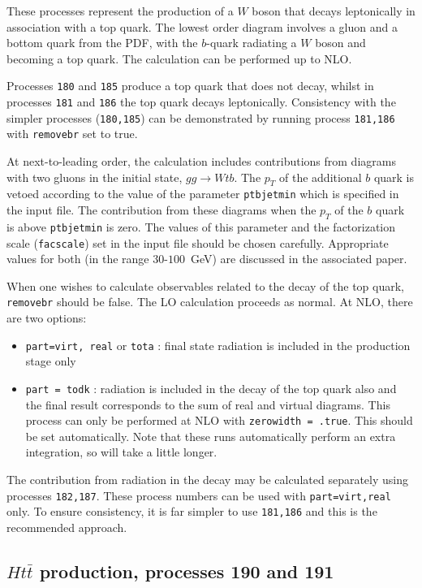\documentclass[12pt]{article}
\begin{document}
These processes represent the production of a $W$ boson that decays leptonically
in association with a top quark. The lowest order diagram involves a gluon and
a bottom quark from the PDF, with the $b$-quark radiating a $W$ boson and
becoming a top quark. The calculation can be performed up to NLO.

Processes {\tt 180} and {\tt 185} produce a top quark that does not decay,
whilst in processes {\tt 181} and {\tt 186} the top quark decays leptonically.
Consistency with
the simpler processes ({\tt 180,185}) can be demonstrated by running process
{\tt 181,186} with {\tt removebr} set to true.

At next-to-leading order, the calculation includes contributions from diagrams
with two gluons in the initial state, $gg \rightarrow Wtb$. The $p_T$ of the
additional $b$ quark is vetoed according to the value of the parameter
{\tt ptbjetmin} which is specified in the input file. The contribution from
these diagrams when the $p_T$ of the $b$ quark is above {\tt ptbjetmin}
is zero. The values of this parameter and the factorization scale ({\tt facscale})
set in the input file should be chosen carefully. Appropriate values for both
(in the range $30$-$100$~GeV) are discussed in the associated paper.

When one wishes to calculate observables related to the decay of the top
quark, {\tt removebr} should be false.
The LO calculation proceeds as normal. At NLO, there are two options:
\begin{itemize}
\item {\tt part=virt, real} or {\tt tota} : final state radiation is included
in the production stage only
\item {\tt part = todk} : radiation is included in the decay of the top
quark also and the final result corresponds to the sum of real and virtual
diagrams. This process can only be performed at NLO with 
{\tt zerowidth = .true}. This should be set automatically.
Note that these runs automatically perform an extra integration, so
will take a little longer.
\end{itemize}

The contribution from radiation in the decay may be calculated separately using
processes {\tt 182,187}. These process numbers can be used with {\tt part=virt,real}
only. To ensure consistency, it is far simpler to use {\tt 181,186}
and this is the recommended approach.

\subsection{$Ht{\bar t}$ production, processes 190 and 191}
\label{subsec:htt}
\end{document}
